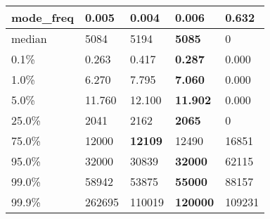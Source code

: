 \begin{table}[H]
\begin{tabular}{|l|m{10em}|m{10em}|m{10em}|m{10em}|}
\hline mode\_freq & 0.005 & \bfseries 0.004 & 0.006 & \cellcolor[rgb]{0.9, 0.54, 0.52} 0.632 \\
\hline median & 5084 & 5194 & \bfseries 5085 & \cellcolor[rgb]{0.9, 0.54, 0.52} 0 \\
\hline 0.1\% & 0.263 & 0.417 & \bfseries 0.287 & \cellcolor[rgb]{0.9, 0.54, 0.52} 0.000 \\
\hline 1.0\% & 6.270 & 7.795 & \bfseries 7.060 & \cellcolor[rgb]{0.9, 0.54, 0.52} 0.000 \\
\hline 5.0\% & 11.760 & 12.100 & \bfseries 11.902 & \cellcolor[rgb]{0.9, 0.54, 0.52} 0.000 \\
\hline 25.0\% & 2041 & 2162 & \bfseries 2065 & \cellcolor[rgb]{0.9, 0.54, 0.52} 0 \\
\hline 75.0\% & 12000 & \bfseries 12109 & 12490 & \cellcolor[rgb]{0.9, 0.54, 0.52} 16851 \\
\hline 95.0\% & 32000 & 30839 & \bfseries 32000 & \cellcolor[rgb]{0.9, 0.54, 0.52} 62115 \\
\hline 99.0\% & 58942 & 53875 & \bfseries 55000 & \cellcolor[rgb]{0.9, 0.54, 0.52} 88157 \\
\hline 99.9\% & 262695 & 110019 & \bfseries 120000 & \cellcolor[rgb]{0.9, 0.54, 0.52} 109231 \\
\hline
\end{tabular}
\end{table}
